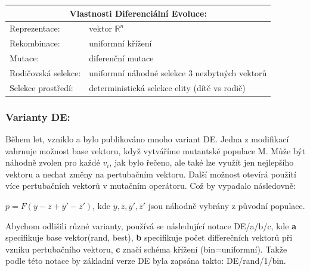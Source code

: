 \begin{center}
\begin{tabular}{ l l }
    \multicolumn{2}{c}{Vlastnosti Diferenciální Evoluce:} \\
    \hline \hline
    Reprezentace: & vektor $\mathbb{R}^n$ \\
    \hline  
    Rekombinace: & uniformní křížení \\
    \hline  
    Mutace: & diferenční mutace \\
    \hline   
    Rodičovská selekce: & uniformní náhodné selekce 3 nezbytných vektorů \\
    \hline   
    Selekce prostředí: & deterministická selekce elity (dítě vs rodič) \\
  \end{tabular}
\end{center} \par
\subsubsection{Varianty DE:}
Během let, vzniklo a bylo publikováno mnoho variant DE. Jedna z modifikací zahrnuje možnost base vektoru, když vytváříme mutantské populace M. Může být náhodně zvolen pro každé $v_i$, jak bylo řečeno, ale také lze využít jen nejlepšího vektoru a nechat změny na pertubačním vektoru. Další možnost otevírá použití více pertubačních vektorů v mutačním operátoru. Což by vypadalo následovně: \par
$\overline{p} = F (\overline{y}-\overline{z} + \overline{y}' - \overline{z}')$, kde $\overline{y}, \overline{z}, \overline{y}',\overline{z}'$ jsou náhodně vybrány z původní populace.\par
Abychom odlišili různé varianty, používá se následující notace DE/a/b/c, kde \textbf{a} specifikuje base vektor(rand, best), \textbf{b} specifikuje počet differečních  vektorů při vzniku pertubačního vektoru, \textbf{c} značí schéma křížení (bin=uniformní). Takže podle této notace by základní verze DE byla zapsána takto: DE/rand/1/bin. 
